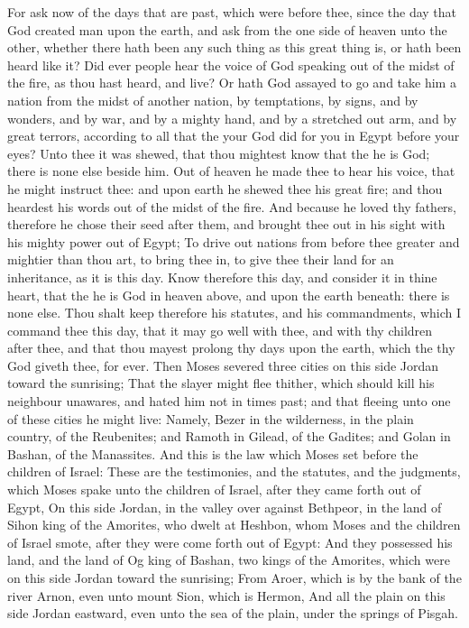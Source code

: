 \begin{biblechapter}
 For ask now of the days that are past, which were before thee, since the day that God created man upon the earth, and ask from the one side of heaven unto the other, whether there hath been any such thing as this great thing is, or hath been heard like it?
\verse Did ever people hear the voice of God speaking out of the midst of the fire, as thou hast heard, and live?
\verse Or hath God assayed to go and take him a nation from the midst of another nation, by temptations, by signs, and by wonders, and by war, and by a mighty hand, and by a stretched out arm, and by great terrors, according to all that the \LORD your God did for you in Egypt before your eyes?
\verse Unto thee it was shewed, that thou mightest know that the \LORD he is God; there is none else beside him.
\verse Out of heaven he made thee to hear his voice, that he might instruct thee: and upon earth he shewed thee his great fire; and thou heardest his words out of the midst of the fire.
\verse And because he loved thy fathers, therefore he chose their seed after them, and brought thee out in his sight with his mighty power out of Egypt;
\verse To drive out nations from before thee greater and mightier than thou art, to bring thee in, to give thee their land for an inheritance, as it is this day.
\verse Know therefore this day, and consider it in thine heart, that the \LORD he is God in heaven above, and upon the earth beneath: there is none else.
\verse Thou shalt keep therefore his statutes, and his commandments, which I command thee this day, that it may go well with thee, and with thy children after thee, and that thou mayest prolong thy days upon the earth, which the \LORD thy God giveth thee, for ever.
 Then Moses severed three cities on this side Jordan toward the sunrising;
\verse That the slayer might flee thither, which should kill his neighbour unawares, and hated him not in times past; and that fleeing unto one of these cities he might live:
\verse Namely, Bezer in the wilderness, in the plain country, of the Reubenites; and Ramoth in Gilead, of the Gadites; and Golan in Bashan, of the Manassites.
 And this is the law which Moses set before the children of Israel:
\verse These are the testimonies, and the statutes, and the judgments, which Moses spake unto the children of Israel, after they came forth out of Egypt,
\verse On this side Jordan, in the valley over against Bethpeor, in the land of Sihon king of the Amorites, who dwelt at Heshbon, whom Moses and the children of Israel smote, after they were come forth out of Egypt:
\verse And they possessed his land, and the land of Og king of Bashan, two kings of the Amorites, which were on this side Jordan toward the sunrising;
\verse From Aroer, which is by the bank of the river Arnon, even unto mount Sion, which is Hermon,
\verse And all the plain on this side Jordan eastward, even unto the sea of the plain, under the springs of Pisgah.
\end{biblechapter}

